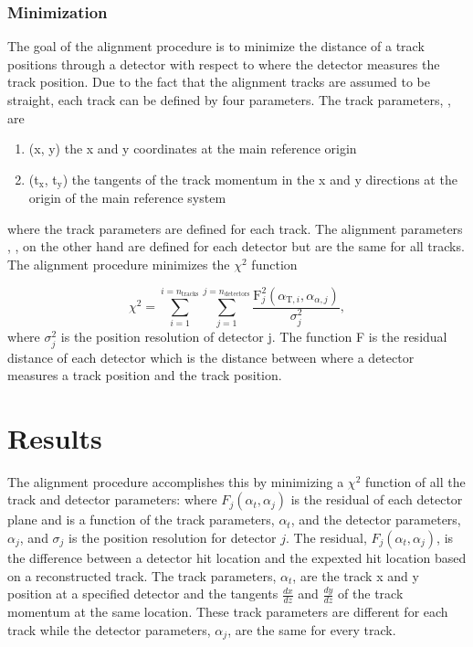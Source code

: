\subsubsection{Minimization}

The goal of the alignment procedure is to minimize the distance of a track
positions through a detector with respect to where the detector measures the
track position.  Due to the fact that the alignment tracks are assumed to be
straight, each track can be defined by four parameters.  The track parameters,
{\atrack}, are

\begin{enumerate}[label=\roman*:]
\item (x, y) the x and y coordinates at the main reference origin
\item (t$_{\mathrm{x}}$, t$_{\mathrm{y}}$) the tangents of the track momentum in
  the x and y directions at the origin of the main reference system
\end{enumerate}
\noindent
where the track parameters are defined for each track.  The alignment parameters
, {\adet}, on the other hand are defined for each detector but are the same for
all tracks.  The alignment procedure minimizes the $\chi^2$ function

\begin{equation}
  \chi^2 = \sum_{i=1}^{i=n_{\mathrm{tracks}}}\sum_{j=1}^{j=n_{\mathrm{detectors}}}
  \frac{\mathrm{F}^2_j(\alpha_{\mathrm{T}, i}, \alpha_{\alpha, j})}{\sigma_j^2},
  \label{equ:chi_align}%
\end{equation}
\noindent
where $\sigma^2_j$ is the position resolution of detector j.  The function F is
the residual distance of each detector which is the distance between where a
detector measures a track position and the track position.

\section{Results}
  The alignment procedure accomplishes this by minimizing a
$\chi^2$ function of all the track and detector parameters:
%
%
where $F_j(\alpha_t, \alpha_j)$ is the residual of each detector plane
and is a function of the track parameters, $\alpha_t$, and the
detector parameters, $\alpha_j$, and $\sigma_j$ is the position
resolution for detector $j$. The residual, $F_j(\alpha_t, \alpha_j)$,
is the difference between a detector hit location and the expexted hit
location based on a reconstructed track.  The track parameters,
$\alpha_t$, are the track x and y position at a specified detector and
the tangents $\frac{dx}{dz}$ and $\frac{dy}{dz}$ of the track momentum
at the same location.  These track parameters are different for each
track while the detector parameters, $\alpha_j$,
are the same for every track.  \par





